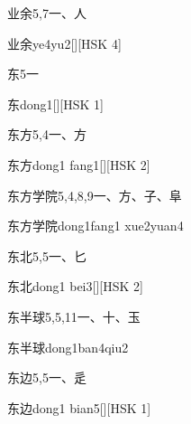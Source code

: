 \begin{entry}{业余}{5,7}{⼀、⼈}
  \begin{phonetics}{业余}{ye4yu2}[][HSK 4]
  \end{phonetics}
\end{entry}

\begin{entry}{东}{5}{⼀}
  \begin{phonetics}{东}{dong1}[][HSK 1]
  \end{phonetics}
\end{entry}

\begin{entry}{东方}{5,4}{⼀、⽅}
  \begin{phonetics}{东方}{dong1 fang1}[][HSK 2]
  \end{phonetics}
\end{entry}

\begin{entry}{东方学院}{5,4,8,9}{⼀、⽅、⼦、⾩}
  \begin{phonetics}{东方学院}{dong1fang1 xue2yuan4}
  \end{phonetics}
\end{entry}

\begin{entry}{东北}{5,5}{⼀、⼔}
  \begin{phonetics}{东北}{dong1 bei3}[][HSK 2]
  \end{phonetics}
\end{entry}

\begin{entry}{东半球}{5,5,11}{⼀、⼗、⽟}
  \begin{phonetics}{东半球}{dong1ban4qiu2}
  \end{phonetics}
\end{entry}

\begin{entry}{东边}{5,5}{⼀、⾡}
  \begin{phonetics}{东边}{dong1 bian5}[][HSK 1]
  \end{phonetics}
\end{entry}

